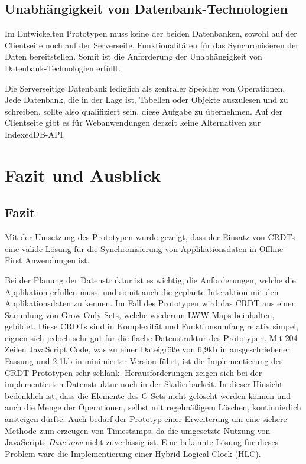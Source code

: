 \documentclass[a4paper, 12pt]{scrreprt}
\begin{document}

\section{Unabhängigkeit von Datenbank-Technologien}

Im Entwickelten Prototypen muss keine der beiden Datenbanken, sowohl auf der Clientseite noch auf der Serverseite, Funktionalitäten für das Synchronisieren der Daten bereitstellen. Somit ist die Anforderung der Unabhängigkeit von Datenbank-Technologien erfüllt. 

Die Serverseitige Datenbank lediglich als zentraler Speicher von Operationen. Jede Datenbank, die in der Lage ist, Tabellen oder Objekte auszulesen und zu schreiben, sollte also qualifiziert sein, diese Aufgabe zu übernehmen. Auf der Clientseite gibt es für Webanwendungen derzeit keine Alternativen zur IndexedDB-API. 


\chapter{Fazit und Ausblick}

\section{Fazit}

Mit der Umsetzung des Prototypen wurde gezeigt, dass der Einsatz von CRDTs eine valide Lösung für die Synchronisierung von Applikationsdaten in Offline-First Anwendungen ist.

Bei der Planung der Datenstruktur ist es wichtig, die Anforderungen, welche die Applikation erfüllen muss, und somit auch die geplante Interaktion mit den Applikationsdaten zu kennen. Im Fall des Prototypen wird das CRDT aus einer Sammlung von Grow-Only Sets, welche wiederum LWW-Maps beinhalten, gebildet. Diese CRDTs sind in Komplexität und Funktionsumfang relativ simpel, eignen sich jedoch sehr gut für die flache Datenstruktur des Prototypen. Mit 204 Zeilen JavaScript Code, was zu einer Dateigröße von 6,9kb in ausgeschriebener Fassung und 2,1kb in minimierter Version führt, ist die Implementierung des CRDT Prototypen sehr schlank. Herausforderungen zeigen sich bei der implementierten Datenstruktur noch in der Skalierbarkeit. In dieser Hinsicht bedenklich ist, dass die Elemente des G-Sets nicht gelöscht werden können und auch die Menge der Operationen, selbst mit regelmäßigem Löschen, kontinuierlich ansteigen dürfte. Auch bedarf der Prototyp einer Erweiterung um eine sichere Methode zum erzeugen von Timestamps, da die umgesetzte Nutzung von JavaScripts \textit{Date.now} nicht zuverlässig ist. Eine bekannte Lösung für dieses Problem wäre die Implementierung einer Hybrid-Logical-Clock (HLC).
\end{document}
